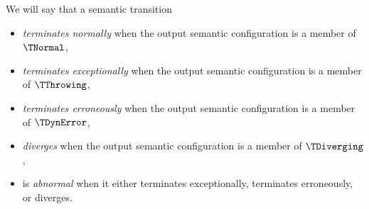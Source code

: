 
We will say that a semantic transition
\begin{itemize}
\item \emph{terminates normally} when the output semantic configuration is a member of \\
      $\TNormal$,
\item \emph{terminates exceptionally} when the output semantic configuration is a member of $\TThrowing$,
\item \emph{terminates erroneously} when the output semantic configuration is a member of $\TDynError$,
\item \emph{diverges} when the output semantic configuration is a member of $\TDiverging$,
\item is \emph{abnormal} when it either terminates exceptionally, terminates erroneously, or diverges.
\end{itemize}

